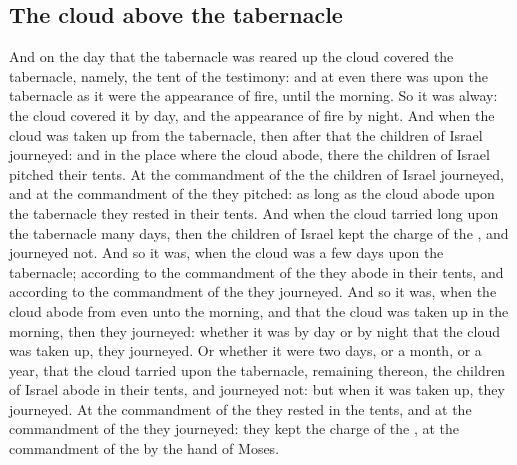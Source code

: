 \begin{biblechapter}
\section*{The cloud above the tabernacle}
\verse And on the day that the tabernacle was reared up the cloud covered the tabernacle, namely, the tent of the testimony: and at even there was upon the tabernacle as it were the appearance of fire, until the morning.
\verse So it was alway: the cloud covered it by day, and the appearance of fire by night.
\verse And when the cloud was taken up from the tabernacle, then after that the children of Israel journeyed: and in the place where the cloud abode, there the children of Israel pitched their tents.
\verse At the commandment of the \LORD the children of Israel journeyed, and at the commandment of the \LORD they pitched: as long as the cloud abode upon the tabernacle they rested in their tents.
\verse And when the cloud tarried long upon the tabernacle many days, then the children of Israel kept the charge of the \LORD, and journeyed not.
\verse And so it was, when the cloud was a few days upon the tabernacle; according to the commandment of the \LORD they abode in their tents, and according to the commandment of the \LORD they journeyed.
\verse And so it was, when the cloud abode from even unto the morning, and that the cloud was taken up in the morning, then they journeyed: whether it was by day or by night that the cloud was taken up, they journeyed.
\verse Or whether it were two days, or a month, or a year, that the cloud tarried upon the tabernacle, remaining thereon, the children of Israel abode in their tents, and journeyed not: but when it was taken up, they journeyed.
\verse At the commandment of the \LORD they rested in the tents, and at the commandment of the \LORD they journeyed: they kept the charge of the \LORD, at the commandment of the \LORD by the hand of Moses.
\end{biblechapter}

